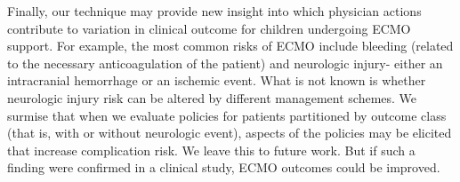 \documentclass[letterpaper]{article} %
\begin{document}
Finally, our technique may provide new insight into which physician actions contribute to variation in clinical outcome for children undergoing ECMO support. For example, the most common risks of ECMO include bleeding (related to the necessary anticoagulation of the patient) and neurologic injury- either an intracranial hemorrhage or an ischemic event. What is not known is whether neurologic injury risk can be altered by different management schemes. We surmise that when we evaluate policies for patients partitioned by outcome class (that is, with or without neurologic event), aspects of the policies may be elicited that increase complication risk. We leave this to future work. But if such a finding were confirmed in a clinical study, ECMO outcomes could be improved.





%

\end{document}
